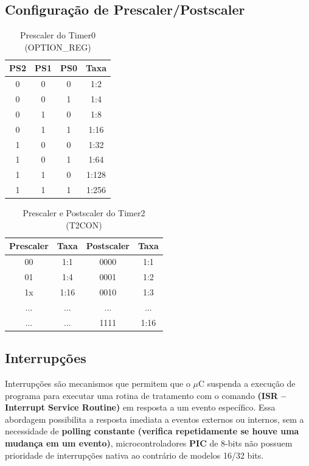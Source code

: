 \documentclass[12pt,a4paper]{book}
\begin{document}
\subsection{Configuração de Prescaler/Postscaler}
\begin{table}[H]
  \centering
  \begin{tabular}{|c|c|c|c|}
    \hline
    \textbf{PS2} & \textbf{PS1} & \textbf{PS0} & \textbf{Taxa} \\
    \hline
    0 & 0 & 0 & 1:2 \\
    0 & 0 & 1 & 1:4 \\
    0 & 1 & 0 & 1:8 \\
    0 & 1 & 1 & 1:16 \\
    1 & 0 & 0 & 1:32 \\
    1 & 0 & 1 & 1:64 \\
    1 & 1 & 0 & 1:128 \\
    1 & 1 & 1 & 1:256 \\
    \hline
  \end{tabular}
  \caption{Prescaler do Timer0 (OPTION\_REG)}
\end{table}

\begin{table}[H]
  \centering
  \begin{tabular}{|c|c|c|c|}
    \hline
    \textbf{Prescaler} & \textbf{Taxa} & \textbf{Postscaler} & \textbf{Taxa} \\
    \hline
    00 & 1:1 & 0000 & 1:1 \\
    01 & 1:4 & 0001 & 1:2 \\
    1x & 1:16 & 0010 & 1:3 \\
    ... & ... & ... & ... \\
    ... & ... & 1111 & 1:16 \\
    \hline
  \end{tabular}
  \caption{Prescaler e Postscaler do Timer2 (T2CON)}
\end{table}

\subsection{Interrupções}
Interrupções são mecanismos que permitem que o $\mu$C suspenda a execução de programa para executar uma rotina de tratamento com o comando \textbf{(ISR – Interrupt Service Routine)} em resposta a um evento específico. Essa abordagem possibilita a resposta imediata a eventos externos ou internos, sem a necessidade de \textbf{polling constante (verifica repetidamente se houve uma mudança em um evento)}, microcontroladores \textbf{PIC} de 8-bits não possuem prioridade de interrupções nativa ao contrário de modelos 16/32 bits. 
\end{document}
